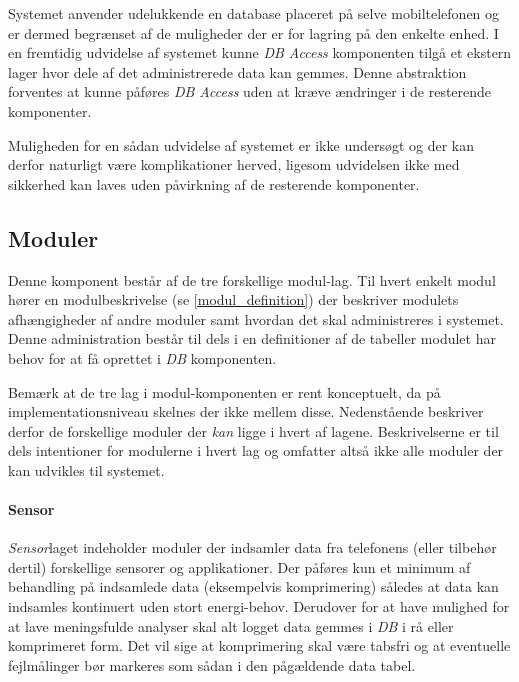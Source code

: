 Systemet anvender udelukkende en database placeret på selve mobiltelefonen og er dermed begrænset af de muligheder der er for lagring på den enkelte enhed.
I en fremtidig udvidelse af systemet kunne \textit{DB Access} komponenten tilgå et ekstern lager hvor dele af det administrerede data kan gemmes.
Denne abstraktion forventes at kunne påføres \textit{DB Access} uden at kræve ændringer i de resterende komponenter.

Muligheden for en sådan udvidelse af systemet er ikke undersøgt og der kan derfor naturligt være komplikationer herved, ligesom udvidelsen ikke med sikkerhed kan laves uden påvirkning af de resterende komponenter.

\subsection*{Moduler}
Denne komponent består af de tre forskellige modul-lag.
Til hvert enkelt modul hører en modulbeskrivelse (se \cref{modul_definition}) der beskriver modulets afhængigheder af andre moduler samt hvordan det skal administreres i systemet.
Denne administration består til dels i en definitioner af de tabeller modulet har behov for at få oprettet i \textit{DB} komponenten.

Bemærk at de tre lag i modul-komponenten er rent konceptuelt, da på implementationsniveau skelnes der ikke mellem disse.
Nedenstående beskriver derfor de forskellige moduler der \textit{kan} ligge i hvert af lagene.
Beskrivelserne er til dels intentioner for modulerne i hvert lag og omfatter altså ikke alle moduler der kan udvikles til systemet.

\paragraph{Sensor}
\textit{Sensor}laget indeholder moduler der indsamler data fra telefonens (eller tilbehør dertil) forskellige sensorer og applikationer.
Der påføres kun et minimum af behandling på indsamlede data (eksempelvis komprimering) således at data kan indsamles kontinuert uden stort energi-behov.
Derudover for at have mulighed for at lave meningsfulde analyser skal alt logget data gemmes i \textit{DB} i rå eller komprimeret form.
Det vil sige at komprimering skal være tabsfri og at eventuelle fejlmålinger bør markeres som sådan i den pågældende data tabel.


